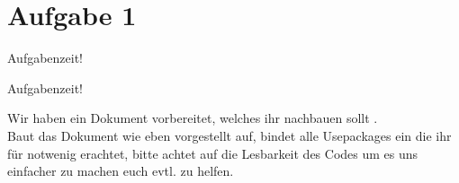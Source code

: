 \section{Aufgabe 1}
\begin{frame}{Aufgabenzeit!}
\begin{center}
\huge Aufgabenzeit!\normalsize
\end{center}\vspace{1.5cm}
Wir haben ein Dokument vorbereitet, welches ihr nachbauen sollt \smiley.\\\vspace{3mm}
Baut das Dokument wie eben vorgestellt auf, bindet alle Usepackages ein die ihr f\"ur notwenig erachtet, bitte achtet auf die Lesbarkeit des Codes um es uns einfacher zu machen euch evtl. zu helfen.
\end{frame}